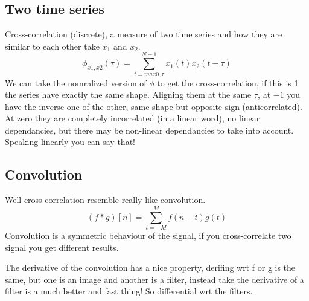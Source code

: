 \documentclass[12pt]{book}
\begin{document}
\subsection{Two time series}
Cross-correlation (discrete), a measure of two time series and how they are similar to each other take $x_1$ and $x_2$.
\begin{equation}
	\phi_{x1,x2}(\tau) = \sum_{t=max{0,\tau}}^{N-1} x_1(t)x_2(t-\tau)
\end{equation}
We can take the nomralized version of $\phi$ to get the cross-correlation, if this is 1 the series have exactly the same shape. Aligning them at the same $\tau$, at $-1$ you have the inverse one of the other, same shape but opposite sign (anticorrelated). At zero they are completely incorrelated (in a linear word), no linear dependancies, but there may be non-linear dependancies to take into account. Speaking linearly you can say that!\newline
\subsection{Convolution} 
Well cross correlation resemble really like convolution.
\begin{equation}
	(f*g)[n]=\sum_{t=-M}^{M} f(n-t)g(t)
\end{equation}
Convolution is a symmetric behaviour of the signal, if you cross-correlate two signal you get different results.

The derivative of the convolution has a nice property, derifing wrt f or g is the same, but one is an image and another is a filter, instead take the derivative of a filter is a much better and fast thing! So differential wrt the filters.
\end{document}
